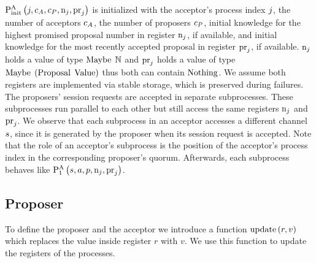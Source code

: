 $\textstyle\operatorname{P^{A}_{init}}\left(
    j,
    c_A,
    c_P,
    \operatorname{n}_{j},
    \operatorname{pr}_{j}
\right)$ is initialized with the acceptor's process index $j$, the number of acceptors $c_A$, the number of proposers $c_P$, initial knowledge for the highest promised proposal number in register $\operatorname{n}_{j}$, if available, and initial knowledge for the most recently accepted proposal in register $\operatorname{pr}_{j}$, if available.
$\operatorname{n}_{j}$ holds a value of type $\operatorname{Maybe}\; \mathbb{N}$ and $\operatorname{pr}_{j}$ holds a value of type $\operatorname{Maybe}\; \left(\operatorname{Proposal}\; \operatorname{Value}\right)$ thus both can contain $\operatorname{Nothing}$.
We assume both registers are implemented via stable storage, which is preserved during failures.
The proposers' session requests are accepted in separate subprocesses.
These subprocesses run parallel to each other but still access the same registers $\operatorname{n}_{j}$ and $\operatorname{pr}_{j}$.
We observe that each subprocess in an acceptor accesses a different channel $s$, since it is generated by the proposer when its session request is accepted.
Note that the role of an acceptor's subprocess is the position of the acceptor's process index in the corresponding proposer's quorum.
Afterwards, each subprocess behaves like $\textstyle\operatorname{P^{A}_{1}}\left(
    s,
    a,
    p,
    \operatorname{n}_{j},
    \operatorname{pr}_{j}
\right)$.

\subsection{Proposer}
To define the proposer and the acceptor we introduce a function $\operatorname{update} \left(r, v\right)$ which replaces the value inside register $r$ with $v$.
We use this function to update the registers of the processes.

